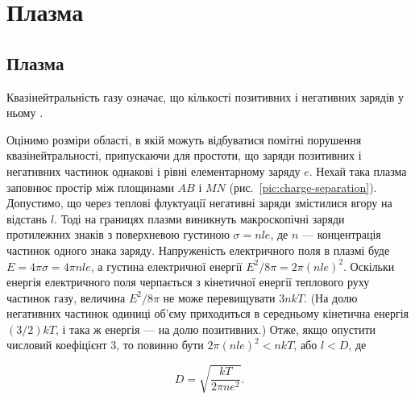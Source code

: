 
\chapter{Плазма}\label{\currfilebase}\hypertarget{Plasma}{}
\graphicspath{{\currfilebase/Pictures}}

\section{Плазма}\label{sec:plasma}\hypertarget{plasma}{}


	 Квазінейтральність газу означає, що кількості позитивних і негативних зарядів у ньому .

	      Оцінимо розміри області, в якій можуть відбуватися помітні порушення квазінейтральності, припускаючи для простоти, що заряди позитивних і негативних частинок однакові і рівні елементарному заряду $e$. Нехай така плазма заповнює простір між площинами $AB$ і $MN$ (рис.~\ref{pic:charge-separation}). Допустимо, що через теплові флуктуації негативні заряди змістилися вгору на відстань $l$. Тоді на границях плазми виникнуть макроскопічні заряди протилежних знаків з поверхневою густиною $\sigma = nle$, де $n$ --- концентрація частинок одного знака заряду. Напруженість електричного поля в плазмі буде $E = 4\pi\sigma = 4\pi nle$, а густина електричної енергії $E^2/8\pi = 2\pi(nle)^2$. Оскільки енергія електричного поля черпається з кінетичної енергії теплового руху частинок газу, величина $E^2/8\pi$ не може перевищувати $3nkT$. (На долю негативних частинок одиниці об'єму приходиться в середньому кінетична енергія $(3/2)kT$, і така ж енергія --- на долю позитивних.) Отже, якщо опустити числовий коефіцієнт 3, то повинно бути $2\pi(nle)^2 < nkT$, або $l < D$, де

\begin{equation}\label{eq:debye-length}
	D = \sqrt{\frac{kT}{2\pi ne^2}}.
\end{equation}

